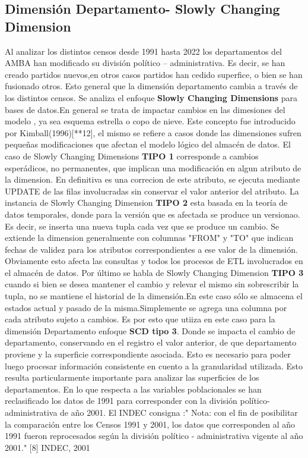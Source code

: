 \documentclass{article}
\theoremstyle{mytheoremstyle}
\theoremstyle{mytheoremstyle}
\theoremstyle{myproblemstyle}
\begin{document}
 \subsection{Dimensión Departamento- Slowly Changing Dimension }
 Al analizar los distintos censos desde 1991 hasta 2022 los departamentos del AMBA han modificado su división político – administrativa.
  Es decir, se han creado partidos nuevos,en otros casos partidos han cedido superfice, o bien se han fusionado otros.
  Esto general que la dimensión departamento cambia a través de los distintos censos. \newline
  Se analiza el enfoque \textbf{Slowly Changing Dimensions} para bases de datos.En general se trata de impactar cambios en las dimesiones del
  modelo , ya sea esquema estrella o copo de nieve. Este concepto fue introducido por Kimball(1996)[**12], el mismo se
   refiere a casos donde las dimensiones sufren pequeñas modificaciones que afectan el modelo lógico del almacén de datos.\newline
  El caso de Slowly Changing Dimensions \textbf{TIPO 1} corresponde a cambios esperádicos, no permanentes, que implican una modificación en algun atributo 
  de la dimension. En definitiva es una correcion de este atributo, se ejecuta mediante UPDATE de las filas involucradas sin conservar el valor anterior del atributo.
  La instancia de Slowly Changing Dimension \textbf{TIPO 2} esta basada en la teoría de datos temporales, donde para la versión que es afectada se produce un versionao.
  Es decir, se inserta una nueva tupla cada vez que se produce un cambio. Se extiende la dimension generalmente con columnas "FROM" y  "TO" que indican 
  fechas de validez para los atributos correspondientes a ese valor de la dimensión. Obviamente esto afecta las consultas y todos los procesos
  de ETL involucrados en el almacén de datos. 
  Por último se habla de  Slowly Changing Dimension \textbf{TIPO 3} cuando si bien se desea mantener el cambio y relevar el mismo sin sobrescribir la tupla, no se 
  mantiene el historial de la dimensión.En este caso sólo se almacena el estados actual y pasado de la misma.Simplemente se agrega una columna
  por cada atributo sujeto a cambios.\newline
  Es por esto que utiiza en este caso para la dimensión Departamento enfoque \textbf{SCD tipo 3}. Donde se impacta el cambio de departamento,
   conservando en el registro el valor anterior, de que departamento proviene y la superficie correspondiente asociada. 
   Esto es necesario para poder luego procesar información consistente en cuento a la granularidad utilizada. Esto resulta particularmente importante para analizar
  las superficies de los departamentos.\newline
  En lo que respecta a las variables poblacionales se han  reclasificado los datos de 1991 para corresponder con la
  división político-administrativa de año 2001. El INDEC consigna :" Nota: con el fin de posibilitar la comparación entre los Censos 1991 y 2001, los datos que 
 corresponden al año 1991 fueron reprocesados según la división político - administrativa
 vigente al año 2001." [8] INDEC, 2001\newline
 
\end{document}
